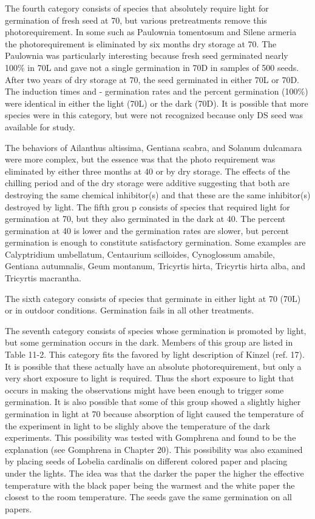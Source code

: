The fourth category consists of species that absolutely require light for
germination of fresh seed at 70, but various pretreatments remove this
photorequirement. In some such as Paulownia tomentosum and Silene armeria the
photorequirement is eliminated by six months dry storage at 70. The Paulownia was
particularly interesting because fresh seed germinated nearly 100\% in 70L and gave
not a single germination in 70D in samples of 500 seeds. After two years of dry
storage at 70, the seed germinated in either 70L or 70D. The induction times and -
germination rates and the percent germination (100\%) were identical in either the light
(70L) or the dark (70D). It is possible that more species were in this category, but were
not recognized because only DS seed was available for study.

The behaviors of Ailanthus altissima, Gentiana scabra, and Solanum
dulcamara were more complex, but the essence was that the photo requirement was
eliminated by either three months at 40 or by dry storage. The effects of the chilling
period and of the dry storage were additive suggesting that both are destroying the
same chemical inhibitor(s) and that these are the same inhibitor(s) destroyed by light.
The fifth grou p consists of species that required light for germination at 70, but
they also germinated in the dark at 40. The percent germination at 40 is lower and the
germination rates are slower, but percent germination is enough to constitute
satisfactory germination. Some examples are Calyptridium umbellatum, Centaurium
scilloides, Cynoglossum amabile, Gentiana autumnalis, Geum montanum, Tricyrtis
hirta, Tricyrtis hirta alba, and Tricyrtis macrantha.

The sixth category consists of species that germinate in either light at 70 (70L)
or in outdoor conditions. Germination fails in all other treatments.

The seventh category consists of species whose germination is promoted by
light, but some germination occurs in the dark. Members of this group are listed in
Table 11-2. This category fits the favored by light description of Kinzel (ref. 17). It is
possible that these actually have an absolute photorequirement, but only a very short
exposure to light is required. Thus the short exposure to light that occurs in making the
observations might have been enough to trigger some germination. It is also possible
that some of this group showed a slightly higher germination in light at 70 because
absorption of light caused the temperature of the experiment in light to be slighly
above the temperature of the dark experiments. This possibility was tested with
Gomphrena and found to be the explanation (see Gomphrena in Chapter 20). This
possibility was also examined by placing seeds of Lobelia cardinalis on different
colored paper and placing under the lights. The idea was that the darker the paper the
higher the effective temperature with the black paper being the warmest and the white
paper the closest to the room temperature. The seeds gave the same germination on
all papers.

